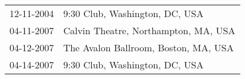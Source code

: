 \begin{supertabular}{ll}
 12-11-2004 &        9:30 Club, Washington, DC, USA \\
 04-11-2007 &  Calvin Theatre, Northampton, MA, USA \\
 04-12-2007 &  The Avalon Ballroom, Boston, MA, USA \\
 04-14-2007 &        9:30 Club, Washington, DC, USA \\
\end{supertabular}

